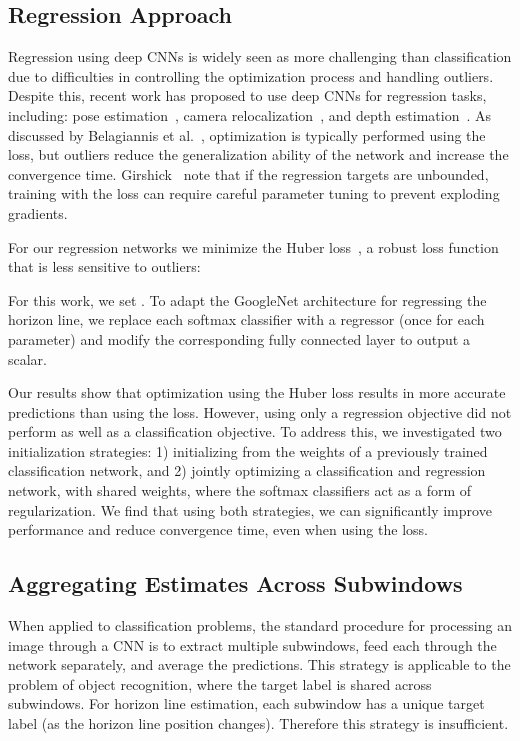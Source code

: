 \documentclass{bmvc2k}
\begin{document}
\subsection{Regression Approach}
\label{sec:regression}

Regression using deep CNNs is widely seen as more challenging than
classification due to difficulties in controlling the optimization
process and handling outliers.
Despite this, recent work has proposed to use deep CNNs for regression
tasks, including: pose estimation~\cite{tompson2015efficient}, camera
relocalization~\cite{kendall2015convolutional}, and depth
estimation~\cite{eigen2014depth}. As discussed by Belagiannis
et al.~\cite{belagiannis2015robust}, optimization is typically
performed using the  loss, but outliers reduce the generalization
ability of the network and increase the convergence time.
Girshick~\cite{girshick2015fast} note that if the regression targets
are unbounded, training with the  loss can require careful
parameter tuning to prevent exploding gradients. 



For our regression networks we minimize the Huber
loss~\cite{huber1964robust}, a robust loss function that is less
sensitive to outliers:

For this work, we set . To adapt the GoogleNet
architecture for regressing the horizon line, we replace each softmax
classifier with a regressor (once for each parameter) and modify the
corresponding fully connected layer to output a scalar.

Our results show that optimization using the Huber loss results in
more accurate predictions than using the  loss. However, using
only a regression objective did not perform as well as a
classification objective. To address this, we investigated two initialization
strategies: 1) initializing from the weights of a previously trained
classification network, and 2) jointly optimizing a classification and
regression network, with shared weights, where the softmax classifiers
act as a form of regularization. We find that using both strategies,
we can significantly improve performance and reduce convergence time,
even when using the  loss.

\subsection{Aggregating Estimates Across Subwindows}
\label{sec:merging}

When applied to classification problems, the standard procedure for
processing an image through a CNN is to extract multiple subwindows,
feed each through the network separately, and average the predictions.
This strategy is applicable to the problem of object recognition,
where the target label is shared across subwindows. For horizon line
estimation, each subwindow has a unique target label (as the
horizon line position changes). Therefore this strategy is
insufficient. 
\end{document}
